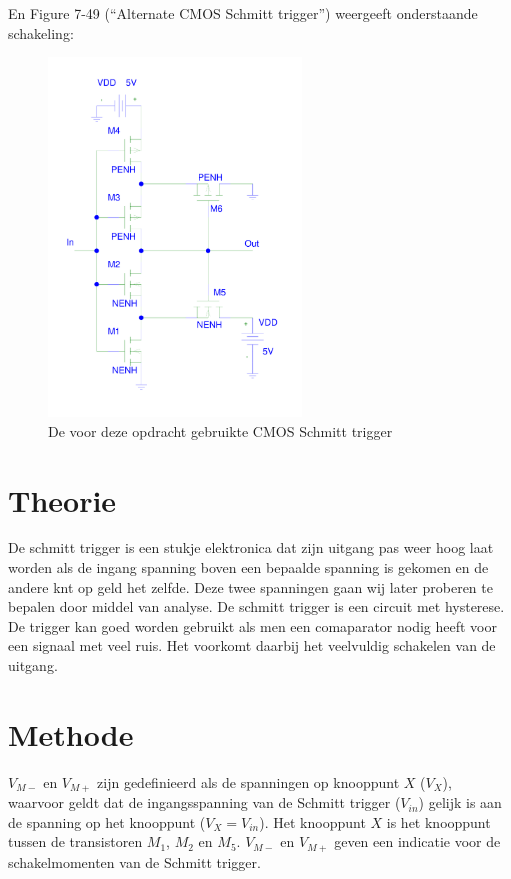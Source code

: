 \documentclass{scrartcl}  %
\begin{document}
En Figure 7-49 (``Alternate CMOS Schmitt trigger'') weergeeft onderstaande schakeling:
\begin{figure}[H]
\centering
	\includegraphics[width=0.6\textwidth]{resource/schmitt-rc.pdf}
	\caption{De voor deze opdracht gebruikte CMOS Schmitt trigger}
	\label{fig:schmitt-schem}
\end{figure}

\section{Theorie}
\label{sec:trig-theorie}
De schmitt trigger is een stukje elektronica dat zijn uitgang pas weer hoog laat worden als de ingang spanning boven een bepaalde spanning is gekomen en de andere knt op geld het zelfde.
Deze twee spanningen gaan wij later proberen te bepalen door middel van analyse.
De schmitt trigger is een circuit met hysterese.
De trigger kan goed worden gebruikt als men een comaparator nodig heeft voor een signaal met veel ruis.
Het voorkomt daarbij het veelvuldig schakelen van de uitgang.

\section{Methode}
\label{sec:trig-methode}
$V_{M-}$ en $V_{M+}$ zijn gedefinieerd als de spanningen op knooppunt $X$ ($V_{X}$), waarvoor geldt dat de ingangsspanning van de Schmitt trigger ($V_{in}$) gelijk is aan de spanning op het knooppunt ($V_{X} = V_{in}$).
Het knooppunt $X$ is het knooppunt tussen de transistoren $M_{1}$, $M_{2}$ en $M_{5}$. $V_{M-}$ en $V_{M+}$ geven een indicatie voor de schakelmomenten van de Schmitt trigger.
\end{document}
